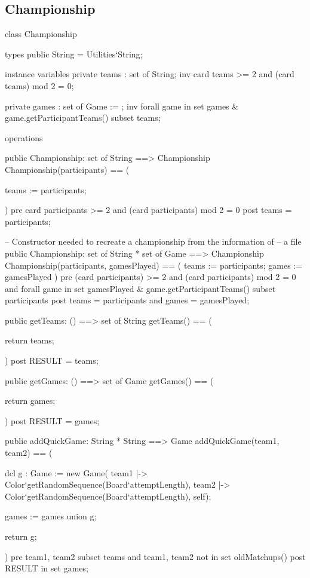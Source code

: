 \documentclass{article}
\begin{document}
\subsection{Championship}
\begin{vdm_al}
class Championship

  types
    public String = Utilities`String;

  instance variables
    private teams : set of String;
    inv card teams >= 2 and (card teams) mod 2 = 0;

    private games : set of Game := {};
    inv forall game in set games & game.getParticipantTeams() subset teams;


  operations

    public Championship: set of String ==> Championship
    Championship(participants) == (

      teams := participants;

    )
    pre card participants >= 2 and (card participants) mod 2 = 0
    post teams = participants;


    -- Constructor needed to recreate a championship from the information of
    -- a file
    public Championship: set of String * set of Game ==> Championship
    Championship(participants, gamesPlayed) == (
      teams := participants;
      games := gamesPlayed
    )
    pre (card participants) >= 2 and (card participants) mod 2 = 0 and
      forall game in set gamesPlayed & game.getParticipantTeams() subset participants
    post teams = participants and games = gamesPlayed;


    public getTeams: () ==> set of String
    getTeams() == (

      return teams;

    )
    post RESULT = teams;


    public getGames: () ==> set of Game
    getGames() == (

      return games;

    )
    post RESULT = games;


    public addQuickGame: String * String ==> Game
    addQuickGame(team1, team2) == (

      dcl g : Game := new Game(
        {team1 |-> Color`getRandomSequence(Board`attemptLength),
          team2 |-> Color`getRandomSequence(Board`attemptLength)},
        self);

      games := games union {g};

      return g;

    )
    pre {team1, team2} subset teams and
      {team1, team2} not in set oldMatchups()
    post RESULT in set games;



\end{vdm_al}
\end{document}
